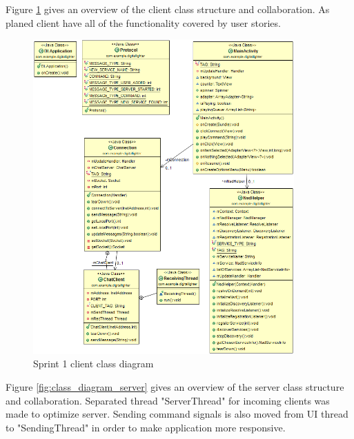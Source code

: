 Figure \ref{fig:class_diagram_client} gives an overview of the client class structure and collaboration. As planed client have all of the functionality covered by user stories. 

\begin{figure}[H]
	\centering
		\includegraphics[width=10cm]{sprint1/class_diagram_client.png}
	\caption{Sprint 1 client class diagram}
	\label{fig:class_diagram_client}
\end{figure}

Figure \ref{fig:class_diagram_server} gives an overview of the server class structure and collaboration. Separated thread "ServerThread" for incoming clients was made to optimize server. Sending command signals is also moved from UI thread to "SendingThread" in order to make application more responsive.

